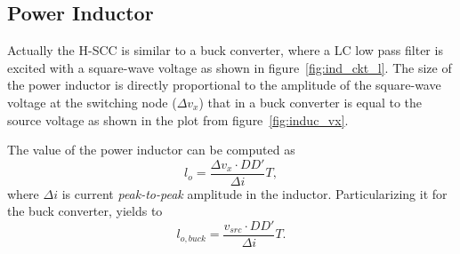 \subsection{Power Inductor}

Actually the H-SCC is similar to a buck converter, where a LC low pass filter is excited with a square-wave voltage as shown in figure~\ref{fig:ind_ckt_l}. The size of the power inductor is directly proportional to the amplitude of the square-wave voltage at the switching node ($\Delta v_x$) that in a buck converter is equal to the source voltage  as shown in the plot from figure~\ref{fig:induc_vx}.

The value of the power inductor can be computed as
\begin{equation}
 l_{o}   = \frac{\Delta v_{x} \cdot DD'}{\Delta i} T,
\label{eq:gen_l}
\end{equation}
where $\Delta i$ is current \emph{peak-to-peak} amplitude in the inductor. Particularizing it for the buck converter, yields to
\begin{equation}
 l_{o,buck}  = \frac{v_{src} \cdot DD'}{\Delta i} T.
\label{eq:buck_l}
\end{equation}

